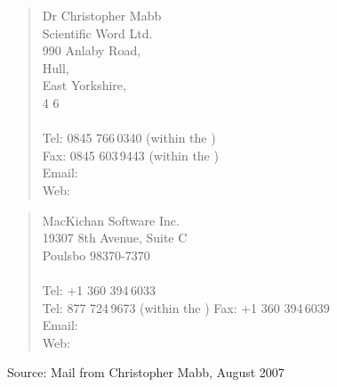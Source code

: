 \begin{description}
\begin{quote}
    Dr Christopher Mabb\\
    Scientific Word Ltd.\\
    990 Anlaby Road,\\
    Hull,\\
    East Yorkshire,\\
    4 6\\
    \\[0.25\baselineskip]
    Tel: 0845 766\,0340 (within the ) \\
    Fax: 0845 603\,9443 (within the ) \\
    Email:  \\
    Web: 
  \end{quote}
  \begin{quote}
    MacKichan Software Inc.\\
    19307 8th Avenue, Suite C\\
    Poulsbo  98370-7370\\
    \\[0.25\baselineskip]
    Tel: +1 360 394\,6033\\
    Tel: 877 724\,9673 (within the )
    Fax: +1  360 394\,6039\\
    Email: \\
    Web: 
  \end{quote}
  Source: Mail from Christopher Mabb, August 2007

\end{description}
